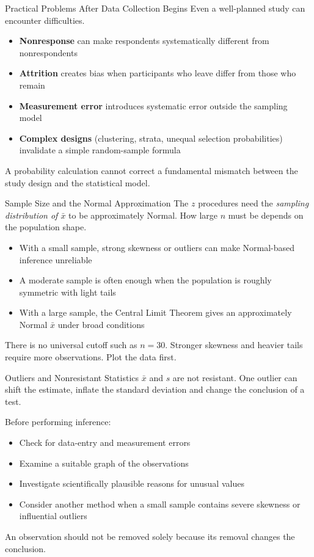 \documentclass[aspectratio=169]{beamer}
\begin{document}
\begin{frame}{Practical Problems After Data Collection Begins}
Even a well-planned study can encounter difficulties.
\begin{itemize}
  \item \textbf{Nonresponse} can make respondents systematically different from nonrespondents
  \item \textbf{Attrition} creates bias when participants who leave differ from those who remain
  \item \textbf{Measurement error} introduces systematic error outside the sampling model
  \item \textbf{Complex designs} (clustering, strata, unequal selection probabilities) invalidate a simple random-sample formula
\end{itemize}
A probability calculation cannot correct a fundamental mismatch between the study design and the statistical model.
\end{frame}

\begin{frame}{Sample Size and the Normal Approximation}
The $z$ procedures need the \emph{sampling distribution of $\bar{x}$} to be approximately Normal. How large $n$ must be depends on the population shape.
\begin{itemize}
  \item With a small sample, strong skewness or outliers can make Normal-based inference unreliable
  \item A moderate sample is often enough when the population is roughly symmetric with light tails
  \item With a large sample, the Central Limit Theorem gives an approximately Normal $\bar{x}$ under broad conditions
\end{itemize}
There is no universal cutoff such as $n=30$. Stronger skewness and heavier tails require more observations. Plot the data first.
\end{frame}

\begin{frame}{Outliers and Nonresistant Statistics}
$\bar{x}$ and $s$ are not resistant. One outlier can shift the estimate, inflate the standard deviation and change the conclusion of a test. 

\vspace{0.2cm}
Before performing inference:
\begin{itemize}
  \item Check for data-entry and measurement errors
  \item Examine a suitable graph of the observations
  \item Investigate scientifically plausible reasons for unusual values
  \item Consider another method when a small sample contains severe skewness or influential outliers
\end{itemize}
An observation should not be removed solely because its removal changes the conclusion.
\end{frame}
\end{document}
